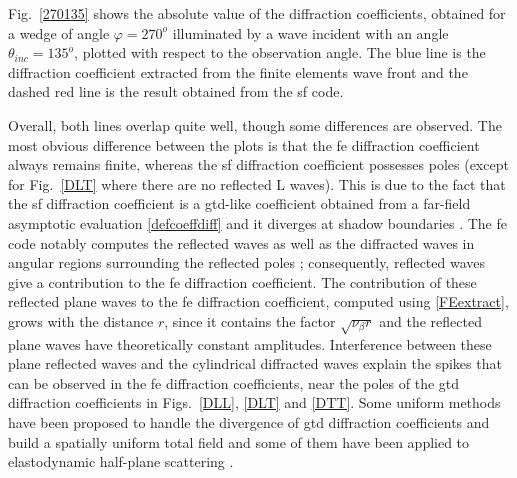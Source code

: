 Fig.~\ref{270135} shows the absolute value of the diffraction coefficients, obtained for a wedge of angle $\varphi=270^o$ illuminated by a wave incident with an angle $\theta_{inc}=135^o$, plotted with respect to the observation angle. The blue line is the diffraction coefficient extracted from the finite elements wave front and the dashed red line is the result obtained from the \acrshort{sf} code. 

Overall, both lines overlap quite well, though some differences are observed. The most obvious difference between the plots is that the \acrshort{fe} diffraction coefficient always remains finite, whereas the \acrshort{sf} diffraction coefficient possesses poles (except for Fig.~\ref{DLT} where there are no reflected L waves). This is due to the fact that the \acrshort{sf} diffraction coefficient is a \acrshort{gtd}-like coefficient obtained from a far-field asymptotic evaluation \eqref{defcoeffdiff} and it diverges at shadow boundaries \cite{GTD,Audrey}. The \acrshort{fe} code notably computes the reflected waves as well as the diffracted waves in angular regions surrounding the reflected poles ; consequently, reflected waves give a contribution to the \acrshort{fe} diffraction coefficient. The contribution of these reflected plane waves to the \acrshort{fe} diffraction coefficient, computed using \eqref{FEextract}, grows with the distance $r$, since it contains the factor $\sqrt{\nu_{\beta}r}$ and the reflected plane waves have theoretically constant amplitudes. Interference between these plane reflected waves and the cylindrical diffracted waves explain the spikes that can be observed in the \acrshort{fe} diffraction coefficients, near the poles of the \acrshort{gtd} diffraction coefficients in Figs.~\ref{DLL}, \ref{DLT} and \ref{DTT}. Some uniform methods have been proposed to handle the divergence of \acrshort{gtd} diffraction coefficients and build a spatially uniform total field and some of them have been applied to elastodynamic half-plane scattering \cite{Audrey, Zernov, PTDdarmon}.

